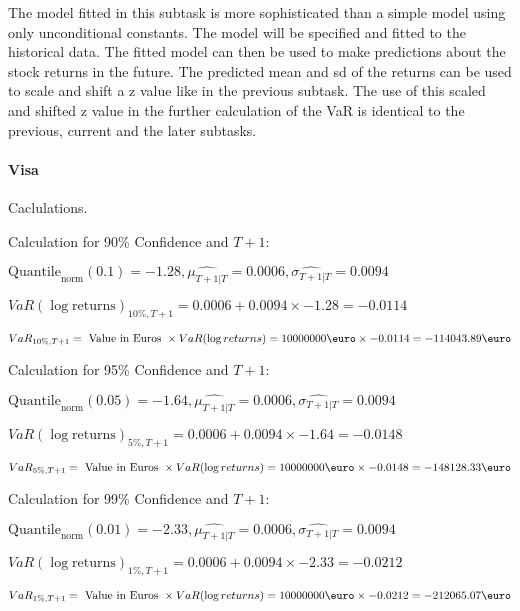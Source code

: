 The model fitted in this subtask is more sophisticated than a simple model using only unconditional constants. 
The model will be specified and fitted to the historical data. The fitted model can then be used to make predictions about the stock returns in the future. The predicted mean and sd of the returns can be used to scale and shift a z value like in the previous subtask.
The use of this scaled and shifted z value in the further calculation of the VaR is identical to the previous, current and the later subtasks.
\paragraph{Visa} Caclulations.\newline \indent 




Calculation for 90\% Confidence and $T+1$:

\indent\indent $\text{Quantile}_\text{norm}(0.1) = -1.28,\hat{\mu_{T+1|T}} = 0.0006, \hat{\sigma_{T+1|T}} = 0.0094$

\indent\indent $VaR(\log \text{returns})_{10\%, T + 1} = 0.0006 + 0.0094\times-1.28 = -0.0114$

\indent\indent $VaR_{10\%, T + 1} = \text{ Value in Euros } \times VaR(\log returns) = 10 000 000 \text{\euro} \times-0.0114 = -114043.89 \text{\euro}$\newline




Calculation for 95\% Confidence and $T+1$:

\indent\indent $\text{Quantile}_\text{norm}(0.05) = -1.64,\hat{\mu_{T+1|T}} = 0.0006, \hat{\sigma_{T+1|T}} = 0.0094$

\indent\indent $VaR(\log \text{returns})_{5\%, T + 1} = 0.0006 + 0.0094\times-1.64 = -0.0148$

\indent\indent $VaR_{5\%, T + 1} = \text{ Value in Euros } \times VaR(\log returns) = 10 000 000 \text{\euro} \times-0.0148 = -148128.33 \text{\euro}$\newline




Calculation for 99\% Confidence and $T+1$:

\indent\indent $\text{Quantile}_\text{norm}(0.01) = -2.33,\hat{\mu_{T+1|T}} = 0.0006, \hat{\sigma_{T+1|T}} = 0.0094$

\indent\indent $VaR(\log \text{returns})_{1\%, T + 1} = 0.0006 + 0.0094\times-2.33 = -0.0212$

\indent\indent $VaR_{1\%, T + 1} = \text{ Value in Euros } \times VaR(\log returns) = 10 000 000 \text{\euro} \times-0.0212 = -212065.07 \text{\euro}$\newline




